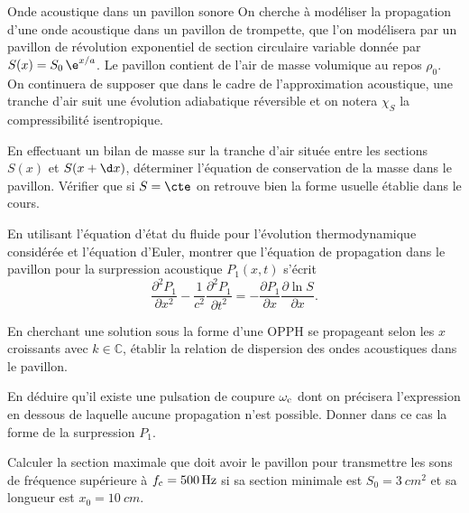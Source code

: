\begin{exo}[PC][3]{Onde acoustique dans un pavillon sonore}
On cherche à modéliser la propagation d'une onde acoustique dans un pavillon de trompette, que l'on modélisera par un pavillon de révolution exponentiel de section circulaire variable donnée par $S(x)=S_{0}\,\e^{x/a}$. Le pavillon contient de l'air de masse volumique au repos $\rho_0$. On continuera de supposer que dans le cadre de l'approximation acoustique, une tranche d'air suit une évolution adiabatique réversible et on notera $\chi_S$ la compressibilité isentropique.
\begin{quest}
\item En effectuant un bilan de masse sur la tranche d'air située entre les sections $S(x)$ et $S(x+\d x)$, déterminer l'équation de conservation de la masse dans le pavillon. Vérifier que si $S=\cte$ on retrouve bien la forme usuelle établie dans le cours.
\item En utilisant l'équation d'état du fluide pour l'évolution thermodynamique considérée et l'équation d'Euler, montrer que l'équation de propagation dans le pavillon pour la surpression acoustique $P_1(x,t)$ s'écrit
\begin{equation*}
\frac{\partial^2 P_1}{\partial x^2}-\frac{1}{c^2}\frac{\partial^2 P_1}{\partial t^2}=-\frac{\partial P_1}{\partial x}\frac{\partial\ln S}{\partial x}.
\end{equation*}
\item En cherchant une solution sous la forme d'une OPPH se propageant selon les $x$ croissants avec $k\in\mathbb{C}$, établir la relation de dispersion des ondes acoustiques dans le pavillon.
\item En déduire qu'il existe une pulsation de coupure $\omega_{\rm{c}}$ dont on précisera l'expression en dessous de laquelle aucune propagation n'est possible. Donner dans ce cas la forme de la surpression $P_1$.
\item Calculer la section maximale que doit avoir le pavillon pour transmettre les sons de fréquence supérieure à $f_{\rm{c}}=\SI{500}{Hz}$ si sa section minimale est $S_0=\SI{3}{cm^2}$ et sa longueur est $x_{0}=\SI{10}{cm}$.
\end{quest}
\end{exo}


